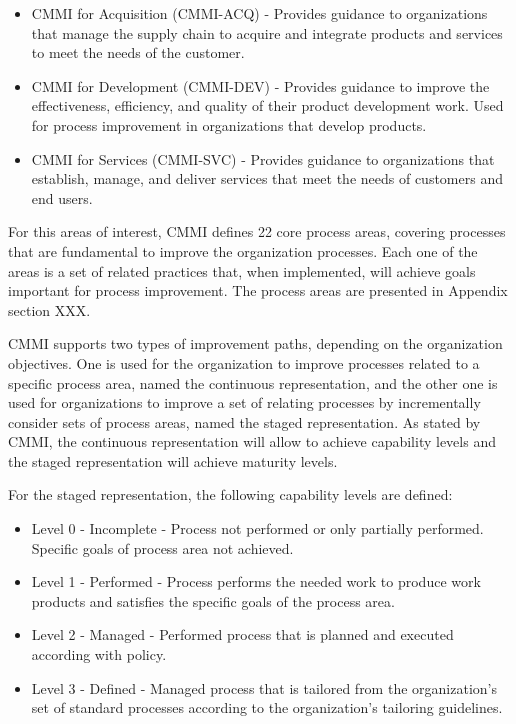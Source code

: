 \begin{itemize}

\item CMMI for Acquisition (CMMI-ACQ) - Provides guidance to organizations that manage the supply chain to acquire and integrate products and services to meet the needs of the customer.

\item CMMI for Development (CMMI-DEV) - Provides guidance to improve the effectiveness, efficiency, and quality of their product development work. Used for process improvement in organizations that develop products.

\item CMMI for Services (CMMI-SVC) - Provides guidance to organizations that establish, manage, and deliver services that meet the needs of customers and end users.

\end{itemize}

For this areas of interest, CMMI defines 22 core process areas, covering processes that are fundamental to improve the organization processes. Each one of the areas is a set of related practices that, when implemented, will achieve goals important for process improvement. The process areas are presented in Appendix section XXX.\par
CMMI supports two types of improvement paths, depending on the organization objectives. One is used for the organization to improve processes related to a specific process area, named the continuous representation, and the other one is used for organizations to improve a set of relating processes by incrementally consider sets of process areas, named the staged representation. As stated by CMMI, the continuous representation will allow to achieve capability levels and the staged representation will achieve maturity levels.\par
For the staged representation, the following capability levels are defined:

\begin{itemize}

\item Level 0 - Incomplete - Process not performed or only partially performed. Specific goals of process area not achieved.

\item Level 1 - Performed - Process performs the needed work to produce work products and satisfies the specific goals of the process area.

\item Level 2 - Managed - Performed process that is planned and executed according with policy.

\item Level 3 - Defined - Managed process that is tailored from the organization's set of standard processes according to the organization's tailoring guidelines.
 
\end{itemize}

